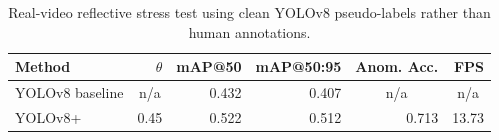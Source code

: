 \begin{table}[t]
\centering
\caption{Real-video reflective stress test using clean YOLOv8 pseudo-labels rather than human annotations.}
\label{tab:real_video_auto}
\small
\setlength{\tabcolsep}{4pt}
\begin{tabular}{lrrrrr}
\toprule
Method & $\theta$ & mAP@50 & mAP@50:95 & Anom. Acc. & FPS \\
\midrule
YOLOv8 baseline & \multicolumn{1}{c}{n/a} & 0.432 & 0.407 & \multicolumn{1}{c}{n/a} & \multicolumn{1}{c}{n/a} \\
YOLOv8+\method{} & 0.45 & 0.522 & 0.512 & 0.713 & 13.73 \\
\bottomrule
\end{tabular}
\end{table}
